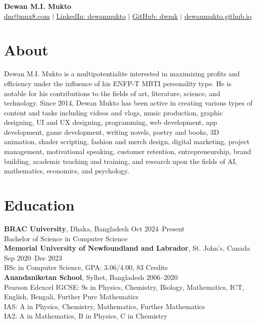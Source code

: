 \documentclass[10pt,letterpaper]{article}
\begin{document}
\begin{center}
    {\huge\bfseries Dewan M.I. Mukto} \\
    \vspace{2pt}
    \small
    \href{mailto:hiring@mux8.com}{dm@mux8.com} $|$
    \href{https://www.linkedin.com/in/dewanmukto}{LinkedIn: dewanmukto} $|$
    \href{https://github.com/dwmk}{GitHub: dwmk} $|$
    \href{https://dewanmukto.github.io/v2}{dewanmukto.github.io}
\end{center}

\section*{About}
Dewan M.I. Mukto is a multipotentialite interested in maximizing profits and efficiency under the influence of his ENFP-T MBTI personality type. He is notable for his contributions to the fields of art, literature, science, and technology. Since 2014, Dewan Mukto has been active in creating various types of content and tasks including videos and vlogs, music production, graphic designing, UI and UX designing, programming, web development, app development, game development, writing novels, poetry and books, 3D animation, shader scripting, fashion and merch design, digital marketing, project management, motivational speaking, customer retention, entrepreneurship, brand building, academic teaching and training, and research upon the fields of AI, mathematics, economics, and psychology.

\section*{Education}
\textbf{BRAC University}, Dhaka, Bangladesh \hfill Oct 2024--Present \\
Bachelor of Science in Computer Science \\
\textbf{Memorial University of Newfoundland and Labrador}, St. John's, Canada \hfill Sep 2020--Dec 2023 \\
BSc in Computer Science, GPA: 3.06/4.00, 83 Credits \\
\textbf{Anandaniketan School}, Sylhet, Bangladesh \hfill 2006--2020 \\
Pearson Edexcel IGCSE: 9s in Physics, Chemistry, Biology, Mathematics, ICT, English, Bengali, Further Pure Mathematics \\
IAS: A in Physics, Chemistry, Mathematics, Further Mathematics \\
IA2: A in Mathematics, B in Physics, C in Chemistry
\end{document}
